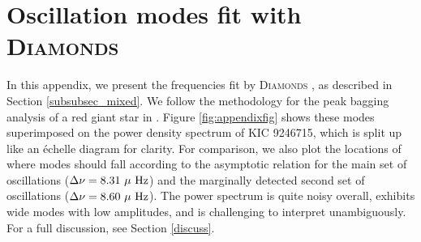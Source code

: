 \appendix
\section{Oscillation modes fit with \textsc{D\large{iamonds}}}
\label{appendix}

In this appendix, we present the frequencies fit by \textsc{D\large{iamonds}} \citep{cor14}, as described in Section \ref{subsubsec_mixed}. We follow the methodology for the peak bagging analysis of a red giant star in \citet{cor15}. Figure \ref{fig:appendixfig} shows these modes superimposed on the power density spectrum of KIC 9246715, which is split up like an \'echelle diagram for clarity. For comparison, we also plot the locations of where modes should fall according to the asymptotic relation \citep{mos12} for the main set of oscillations ($\Delta \nu = 8.31 \ \mu \ \rm{Hz}$) and the marginally detected second set of oscillations ($\Delta \nu = 8.60 \ \mu \ \rm{Hz}$). The power spectrum is quite noisy overall, exhibits wide modes with low amplitudes, and is challenging to interpret unambiguously. For a full discussion, see Section \ref{discuss}.